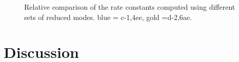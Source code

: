 \begin{figure}[!t]
\caption{Relative comparison of the rate constants computed using different sets of reduced modes. blue = c-1,4ee, gold =d-2,6ae. }
\label{RateComp}
\end{figure}




\section{Discussion}


